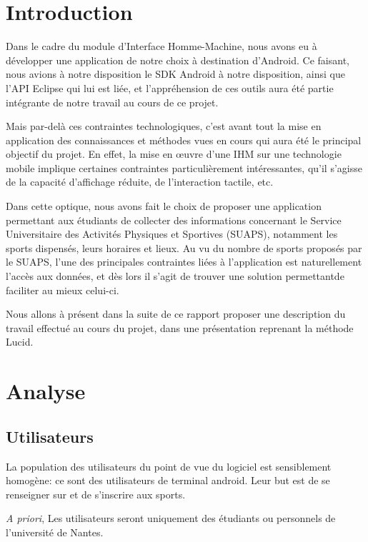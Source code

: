 \documentclass[french, titlepage, 11pt, a4paper]{article}
\begin{document}
\tableofcontents\clearpage

\section*{Introduction}

Dans le cadre du module d'Interface Homme-Machine, nous avons eu à développer
une application de notre choix à destination d'Android.
Ce faisant, nous avions à notre disposition le SDK Android à notre disposition,
ainsi que l'API Eclipse qui lui est liée, et l'appréhension de ces outils aura
été  partie intégrante de notre travail au cours de ce projet.

Mais par-delà ces contraintes technologiques, c'est avant tout la mise en
application des connaissances et méthodes vues en cours qui aura été le
principal objectif du projet.
En effet, la mise en œuvre d'une IHM sur une technologie mobile implique
certaines contraintes particulièrement intéressantes, qu'il s'agisse de la
capacité d'affichage réduite, de l'interaction tactile, etc.

Dans cette optique, nous avons fait le choix de proposer une application
permettant aux étudiants de collecter des informations concernant le Service
Universitaire des Activités Physiques et Sportives (SUAPS), notamment les sports
dispensés, leurs horaires et lieux.
Au vu du nombre de sports proposés par le SUAPS, l'une des principales
contraintes liées à l'application est naturellement l'accès aux données, et dès
lors il s'agit de trouver une solution permettantde faciliter au mieux celui-ci.

Nous allons à présent dans la suite de ce rapport proposer une description du
travail effectué au cours du projet, dans une présentation reprenant la méthode
Lucid.

\section{Analyse}
\label{sec:analyse}

	\subsection{Utilisateurs}
		La population des utilisateurs du point de vue du logiciel est
		sensiblement homogène: ce sont des utilisateurs de terminal android.
		Leur but est de se renseigner sur et de s'inscrire aux sports.

		\emph{A priori}, Les utilisateurs seront uniquement des étudiants ou
		personnels de l'université de Nantes.
\end{document}
